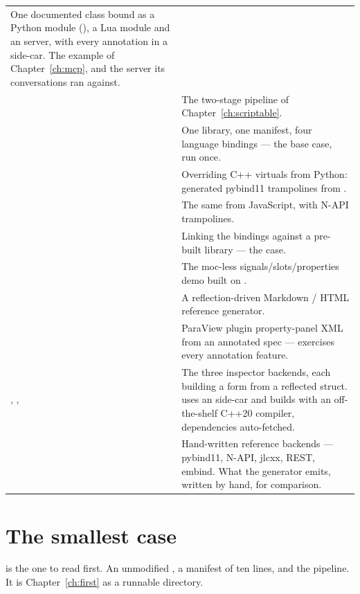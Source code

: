 \begin{center}
\begin{longtable}{@{}L{5.1cm}L{8.5cm}@{}}
  One documented class bound as a Python module (), a Lua
  module and an  server, with every annotation in a side-car. The
  example of Chapter~\ref{ch:mcp}, and the server its conversations ran
  against. \\
\addlinespace
{} &
  The two-stage pipeline of Chapter~\ref{ch:scriptable}. \\
\addlinespace
{} &
  One library, one manifest, four language bindings --- the base case, run
  once. \\
\addlinespace
{} &
  Overriding C++ virtuals from Python: generated pybind11 trampolines from
  . \\
\addlinespace
{} &
  The same from JavaScript, with N-API trampolines. \\
\addlinespace
{} &
  Linking the bindings against a pre-built library --- the 
  case. \\
\addlinespace
{} &
  The moc-less signals/slots/properties demo built on . \\
\addlinespace
{} &
  A reflection-driven Markdown / HTML reference generator. \\
\addlinespace
{} &
  ParaView plugin property-panel XML from an annotated 
  spec --- exercises every annotation feature. \\
\addlinespace
{}, ,  &
  The three inspector backends, each building a form from a reflected struct.
   uses an  side-car and builds with an
  off-the-shelf C++20 compiler, dependencies auto-fetched. \\
\addlinespace
{} &
  Hand-written reference backends --- pybind11, N-API, jlcxx, REST, embind.
  What the generator emits, written by hand, for comparison. \\
\bottomrule
\end{longtable}
\end{center}

\section{The smallest case}

 is the one to read first. An unmodified
, a manifest of ten lines, and the pipeline. It is
Chapter~\ref{ch:first} as a runnable directory.

